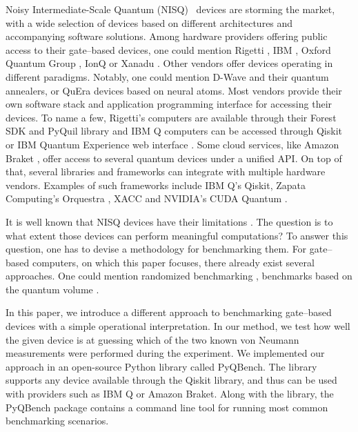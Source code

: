 \documentclass[preprint,12pt, a4paper, dvipsnames]{elsarticle}
\newcommand{\1}{{\rm 1\hspace{-0.9mm}l}}
\theoremstyle{definition}
\begin{document}
Noisy Intermediate-Scale Quantum (NISQ)~\cite{preskill} devices are storming the market, with a wide
selection of devices based on different architectures and accompanying software solutions. Among
hardware providers offering public access to their gate--based devices, one could mention Rigetti
\cite{rigetti}, IBM \cite{ibmq}, Oxford Quantum Group \cite{oxforf}, IonQ \cite{ionq} or Xanadu
\cite{xanadu}. Other vendors offer devices operating in different paradigms. Notably, one could
mention D-Wave \cite{dwave} and their quantum annealers, or QuEra devices \cite{quera} based on
neural atoms. Most vendors provide their own software stack and application programming interface
for accessing their devices. To name a few, Rigetti's computers are available through their Forest
SDK \cite{sdk} and PyQuil library \cite{pyquil} and IBM Q \cite{ibmq} computers can be accessed
through Qiskit \cite{qiskit} or IBM Quantum Experience web interface \cite{ibmqplatform}. Some cloud
services, like Amazon Braket \cite{amazon}, offer access to several quantum devices under a unified
API. On top of that, several libraries and frameworks can integrate with multiple hardware vendors.
Examples of such frameworks include IBM Q's Qiskit, Zapata Computing's Orquestra \cite{zapata}, XACC \cite{xacc} and NVIDIA's CUDA Quantum \cite{cudaquantum}.

It is well known that NISQ devices have their limitations \cite{preskillnew}. The question is to
what extent those devices can perform meaningful computations? To answer this question, one has to
devise a methodology for benchmarking them. For gate--based computers, on which this paper focuses,
there already exist several approaches. One could mention randomized benchmarking
\cite{liu2022sampling, knill2008randomized, wallman2014randomized, helsen2022general,
cornelissen2021scalable}, benchmarks based on the quantum volume \cite{cross2019validating,
moll2018quantum, pelofske2022volume}.

In this paper, we introduce a different approach to benchmarking gate--based devices with a simple
operational interpretation. In our method, we test how well the given device is at guessing which of
the two known von Neumann measurements were performed during the experiment. We implemented our
approach in an open-source Python library called PyQBench. The library supports any device available
through the Qiskit library, and thus can be used with providers such as IBM Q or Amazon Braket.
Along with the library, the PyQBench package contains a command line tool for running most common
benchmarking scenarios.
\end{document}
